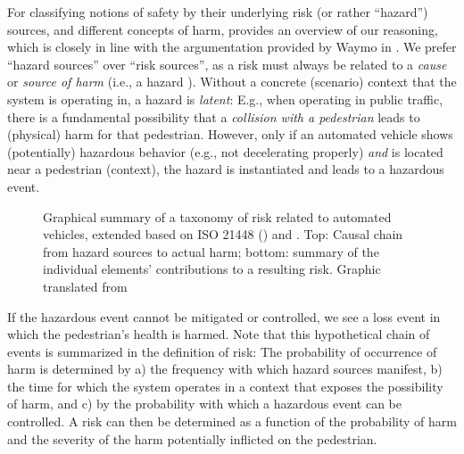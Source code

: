 For classifying notions of safety by their underlying risk (or rather ``hazard'') sources, and different concepts of harm,  provides an overview of our reasoning, which is closely in line with the argumentation provided by Waymo in \parencite{favaro2023}.
We prefer ``hazard sources'' over ``risk sources'', as a risk must always be related to a \emph{cause} or \emph{source of harm} (i.e., a hazard \parencite[p.~1, def. 3.2]{iso51}).
Without a concrete (scenario) context that the system is operating in, a hazard is \emph{latent}: E.g., when operating in public traffic, there is a fundamental possibility that a \emph{collision with a pedestrian} leads to (physical) harm for that pedestrian. 
However, only if an automated vehicle shows (potentially) hazardous behavior (e.g., not decelerating properly) \emph{and} is located near a pedestrian (context), the hazard is instantiated and leads to a hazardous event.
\begin{figure*}
    \caption{Graphical summary of a taxonomy of risk related to automated vehicles, extended based on ISO 21448 (\parencite{iso21448}) and \parencite{favaro2023}. Top: Causal chain from hazard sources to actual harm; bottom: summary of the individual elements' contributions to a resulting risk. Graphic translated from \parencite{nolte2024} \label{fig:hazard-sources}}
\end{figure*}
If the hazardous event cannot be mitigated or controlled, we see a loss event in which the pedestrian's health is harmed.
Note that this hypothetical chain of events is summarized in the definition of risk:
The probability of occurrence of harm is determined by a) the frequency with which hazard sources manifest, b) the time for which the system operates in a context that exposes the possibility of harm, and c) by the probability with which a hazardous event can be controlled.
A risk can then be determined as a function of the probability of harm and the severity of the harm potentially inflicted on the pedestrian.

